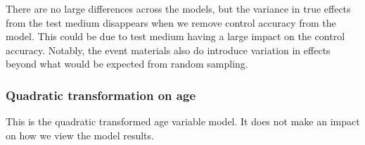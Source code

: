 \documentclass[
  letterpaper,
  DIV=11,
  numbers=noendperiod]{scrartcl}
\begin{document}
There are no large differences across the models, but the variance in
true effects from the test medium disappears when we remove control
accuracy from the model. This could be due to test medium having a large
impact on the control accuracy. Notably, the event materials also do
introduce variation in effects beyond what would be expected from random
sampling.

\hypertarget{quadratic-transformation-on-age}{%
\subsubsection{Quadratic transformation on
age}\label{quadratic-transformation-on-age}}

This is the quadratic transformed age variable model. It does not make
an impact on how we view the model results.
\end{document}
